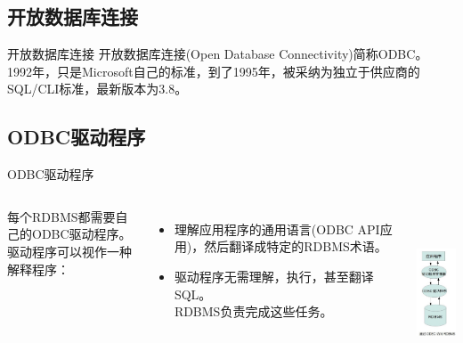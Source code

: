 \documentclass[CJK]{beamer}
\begin{document}
\begin{CJK*}{UTF8}{gbsn}
\subsection{开放数据库连接}
\begin{frame}{开放数据库连接}
开放数据库连接(Open Database Connectivity)简称ODBC。\\
1992年，只是Microsoft自己的标准，到了1995年，被采纳为独立于供应商的SQL/CLI标准，最新版本为3.8。\\
\end{frame}
\subsection{ODBC驱动程序}
\begin{frame}{ODBC驱动程序}
\begin{columns}
	\column[t]{6cm}
	{\small
	每个RDBMS都需要自己的ODBC驱动程序。\\
	驱动程序可以视作一种解释程序：
	\begin{itemize}
		\item 理解应用程序的通用语言(ODBC API应用)，然后翻译成特定的RDBMS术语。
		\item 驱动程序无需理解，执行，甚至翻译SQL。\\RDBMS负责完成这些任务。
	\end{itemize}
	}
	\column[t]{4cm}
	\begin{flushright}
	\includegraphics[height=5cm]{ODBC.jpg}
	\end{flushright}
\end{columns}	
\end{frame}

\end{CJK*}
\end{document}
